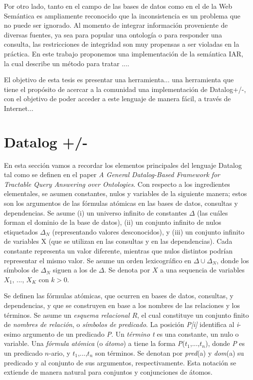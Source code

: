 \documentclass[11pt,a4paper,twoside]{tesis}
\begin{document}
Por otro lado, tanto en el campo de las bases de datos como en el de la Web Semántica es ampliamente reconocido que la inconsistencia es un problema que no puede ser ignorado. Al momento de integrar información proveniente de diversas fuentes, ya sea para popular una ontología o para responder una consulta, las restricciones de integridad son muy propensas a ser violadas en la práctica. En este trabajo proponemos una implementación de la semántica IAR, la cual describe un método para tratar ....

El objetivo de esta tesis es presentar una herramienta... una herramienta que tiene el propósito de acercar a la comunidad una implementación de Datalog+/-, con el objetivo de poder acceder a este lenguaje de manera fácil, a través de Internet...

\section{Datalog +/-}

En esta sección vamos a recordar los elementos principales del lenguaje Datalog tal como se definen en el paper \textit{A General Datalog-Based Framework for
Tractable Query Answering over Ontologies}\cite{JWS}.
Con respecto a los ingredientes elementales, se asumen constantes, nulos y variables de la siguiente manera; estos son los argumentos de las fórmulas atómicas en las bases de datos, consultas y dependencias.
Se asume (i) un universo infinito de constantes  $\Delta$ (las cuáles forman el dominio de la base de  datos), (ii) un conjunto infinito de nulos etiquetados $\Delta_{N}$ (representando valores desconocidos), y (iii) un conjunto infinito de variables X (que se utilizan en las consultas y en las dependencias). Cada constante representa un valor diferente, mientras que nulos distintos podrían representar el mismo valor. 
Se asume un orden lexicográfico en  $\Delta \cup \Delta_{N}$, donde los símbolos de $\Delta_{N}$ siguen a los de $\Delta$. Se denota por $X$ a una sequencia de variables $X_{1}$, ..., $X_{K}$ con $k > 0$.

Se definen las fórmulas atómicas, que ocurren en bases de datos, consultas, y dependencias, y que se construyen en base a los nombres de las relaciones y los términos. Se asume un \textit{esquema relacional $R$}, el cual constituye un conjunto finito de \textit{nombres de relación}, o \textit{símbolos de predicado}. La posición \textit{P[i]} identifica al \textit{i}-esimo argumento de un predicado \textit{P}. Un \textit{término t} es una constante, un nulo o variable. Una \textit{fórmula atómica} (o \textit{átomo}) a tiene la forma \textit{P}($t_{1}$,...,$t_{n}$), donde \textit{P} es un predicado $n$-ario, y $t_{1}$,...,$t_{n}$ son términos. Se denotan por \textit{pred}(a) y \textit{dom}(a) su predicado y al conjunto de sus argumentos, respectivamente. Esta notación se extiende de manera natural para conjuntos y conjunciones de átomos. 
\end{document}
